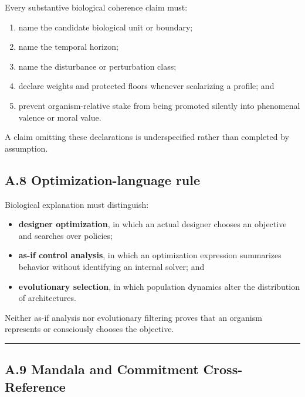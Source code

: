 \documentclass[
  11pt,
]{article}
\providecommand{\tightlist}{%
  \setlength{\itemsep}{0pt}\setlength{\parskip}{0pt}}
\begin{document}
Every substantive biological coherence claim must:

\begin{enumerate}
\def\labelenumi{\arabic{enumi}.}
\tightlist
\item
  name the candidate biological unit or boundary;
\item
  name the temporal horizon;
\item
  name the disturbance or perturbation class;
\item
  declare weights and protected floors whenever scalarizing a profile;
  and
\item
  prevent organism-relative stake from being promoted silently into
  phenomenal valence or moral value.
\end{enumerate}

A claim omitting these declarations is underspecified rather than
completed by assumption.

\subsection{A.8 Optimization-language
rule}\label{a.8-optimization-language-rule}

Biological explanation must distinguish:

\begin{itemize}
\tightlist
\item
  \textbf{designer optimization}, in which an actual designer chooses an
  objective and searches over policies;
\item
  \textbf{as-if control analysis}, in which an optimization expression
  summarizes behavior without identifying an internal solver; and
\item
  \textbf{evolutionary selection}, in which population dynamics alter
  the distribution of architectures.
\end{itemize}

Neither as-if analysis nor evolutionary filtering proves that an
organism represents or consciously chooses the objective.

\begin{center}\rule{0.5\linewidth}{0.5pt}\end{center}

\subsection{A.9 Mandala and Commitment
Cross-Reference}\label{a.9-mandala-and-commitment-cross-reference}
\end{document}
